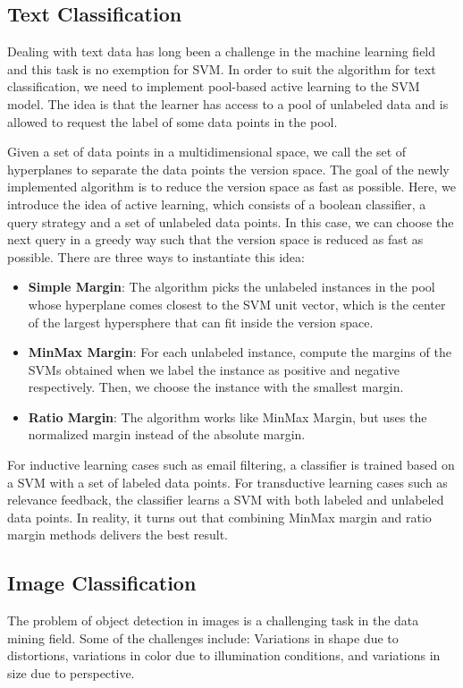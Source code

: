 \subsection*{Text Classification}
Dealing with text data has long been a challenge in the machine learning
field and this task is no exemption for SVM. In order to suit the algorithm
for text classification, we need to implement pool-based active learning
to the SVM model. The idea is that the learner has access to a pool of
unlabeled data and is allowed to request the label of some data points
in the pool.

Given a set of data points in a multidimensional space, we call the set
of hyperplanes to separate the data points the version space. The goal of
the newly implemented algorithm is to reduce the version space as fast as
possible. Here, we introduce the idea of active learning, which consists of
a boolean classifier, a query strategy and a set of unlabeled data points.
In this case, we can choose the next query in a greedy way such that 
the version space is reduced as fast as possible. There are three ways
to instantiate this idea: 

\begin{itemize}
    \item \textbf{Simple Margin}: The algorithm picks the unlabeled instances
    in the pool whose hyperplane comes closest to the SVM unit vector, which is
    the center of the largest hypersphere that can fit inside the version space.
    \item \textbf{MinMax Margin}: For each unlabeled instance, compute the margins
    of the SVMs obtained when we label the instance as positive and negative
    respectively. Then, we choose the instance with the smallest margin.
    \item \textbf{Ratio Margin}: The algorithm works like MinMax Margin, but uses
    the normalized margin instead of the absolute margin.
\end{itemize}

For inductive learning cases such as email filtering, a classifier is trained 
based on a SVM with a set of labeled data points. 
For transductive learning cases such as relevance feedback, the classifier
learns a SVM with both labeled and unlabeled data points. In reality, it turns
out that combining MinMax margin and ratio margin methods delivers the best
result. \cite{text-classification}

\subsection*{Image Classification}
The problem of object detection in images is a challenging task in the
data mining field. Some of the challenges include: Variations in shape
due to distortions, variations in color due to illumination conditions,
and variations in size due to perspective. 

